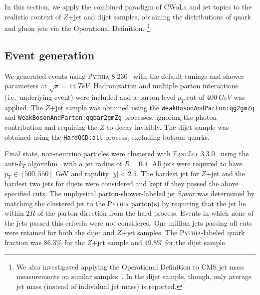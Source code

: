 \documentclass[letterpaper,11pt]{article}
\newcommand{\pythia}{\textsc{Pythia}\xspace}
\begin{document}
In this section, we apply the combined paradigm of CWoLa and jet topics to the realistic context of $Z$+jet and dijet samples, obtaining the distributions of quark and gluon jets via the Operational Definition.%
\footnote{We also investigated applying the Operational Definition to CMS jet mass measurements on similar samples~\cite{Chatrchyan:2013vbb}.  In the dijet sample, though, only average jet mass (instead of individual jet mass) is reported.} 

\subsection{Event generation}
\label{sec:eventgen}


We generated events using \pythia 8.230~\cite{Sjostrand:2014zea} with the default tunings and shower parameters at $\sqrt{s}=\SI{14}{TeV}$.
%
Hadronization and multiple parton interactions (i.e.\ underlying event) were included and a parton-level $p_T$ cut of $\SI{400}{GeV}$ was applied. 
%
The $Z$+jet sample was obtained using the \texttt{WeakBosonAndParton:qg2gmZq} and \texttt{WeakBosonAndParton:qqbar2gmZg} processes, ignoring the photon contribution and requiring the $Z$ to decay invisibly.
%
The dijet sample was obtained using the \texttt{HardQCD:all} process, excluding bottom quarks.


Final state, non-neutrino particles were clustered with \textsc{FastJet} 3.3.0~\cite{Cacciari:2011ma} using the anti-$k_T$ algorithm~\cite{Cacciari:2008gp} with a jet radius of $R=0.4$.
%
All jets were required to have $p_T\in[500,550]$ GeV and rapidity $|y|<2.5$.
%
The hardest jet for $Z$+jet and the hardest two jets for dijets were considered and kept if they passed the above specified cuts.
%
The unphysical parton-shower-labeled jet flavor was determined by matching the clustered jet to the \pythia parton(s) by requiring that the jet lie within $2R$ of the parton direction from the hard process.
%
Events in which none of the jets passed this criteria were not considered.
%
One million jets passing all cuts were retained for both the dijet and $Z$+jet samples. 
%
The \pythia-labeled quark fraction was 86.3\% for the $Z$+jet sample and 49.8\% for the dijet sample.
\end{document}
